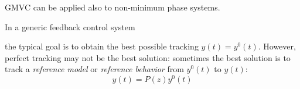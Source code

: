 \begin{rem}
	GMVC can be applied also to non-minimum phase systems.
\end{rem}

\begin{rem}
	In a generic feedback control system
    \begin{figure}[H]
        \centering
    \end{figure}

    the typical goal is to obtain the best possible tracking $y(t) = y^0(t)$. However, perfect tracking may not be the best solution: sometimes the best solution is to track a \emph{reference model} or \emph{reference behavior} from $y^0(t)$ to $y(t)$:
    \[
    	y(t) = P(z)y^0(t)
    \]
\end{rem}

